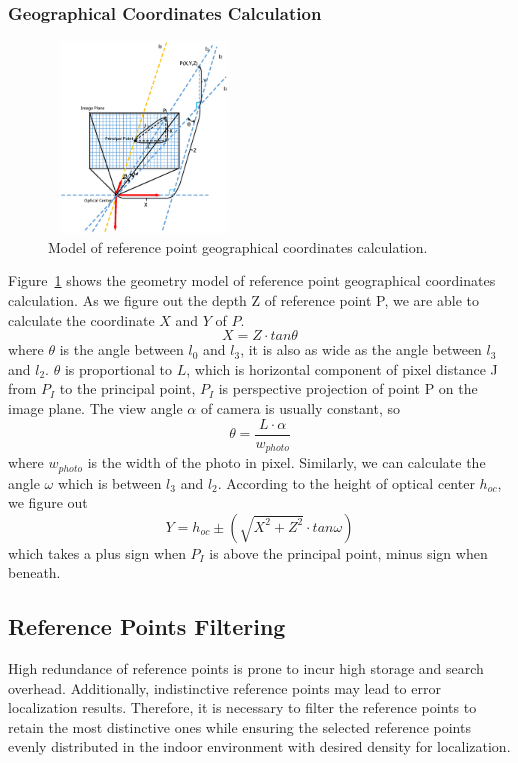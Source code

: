 \subsubsection{Geographical Coordinates Calculation}
\begin{figure}[!hb]
\centering
\includegraphics[width=2in, height=2in]{refgeo.eps}
\caption{Model of reference point geographical coordinates calculation.}
\label{fig_refgeo}
\end{figure}
Figure~\ref{fig_refgeo} shows the geometry model of reference point geographical coordinates calculation. As we figure out the depth Z of reference point P, we are able to calculate the coordinate $X$ and $Y$ of $P$.
\begin{equation}
    X=Z\cdot tan{\theta}
\end{equation}
where $\theta$ is the angle between $l_0$ and $l_3$, it is also as wide as the angle between $l_3$ and $l_2$. $\theta$ is proportional to $L$, which is horizontal component of pixel distance J from $P_I$ to the principal point, $P_I$ is perspective projection of point P on the image plane. The view angle $\alpha$ of camera is usually constant, so
\begin{equation}
    \theta = \frac{L\cdot \alpha}{w_{photo}}
\end{equation}
where $w_{photo}$ is the width of the photo in pixel.
Similarly, we can calculate the angle $\omega$ which is between $l_3$ and $l_2$. According to the height of optical center $h_{oc}$, we figure out
\begin{equation}
    Y=h_{oc}\pm (\sqrt{X^2+Z^2}\cdot tan{\omega} )
\end{equation}
which takes a plus sign when $P_I$ is above the principal point, minus sign when beneath.
\subsection{Reference Points Filtering}
High redundance of reference points is prone to incur high storage and search overhead. Additionally, indistinctive reference points may lead to error localization results. Therefore, it is necessary to filter the reference points to retain the most distinctive ones while ensuring the selected reference points evenly distributed in the indoor environment with desired density for localization.

